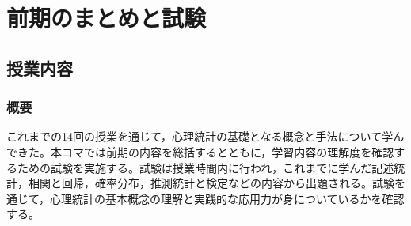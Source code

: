 \section{前期のまとめと試験}
\label{b15_summary_exam}

\subsection{授業内容}
\subsubsection{概要}
これまでの14回の授業を通じて，心理統計の基礎となる概念と手法について学んできた。本コマでは前期の内容を総括するとともに，学習内容の理解度を確認するための試験を実施する。試験は授業時間内に行われ，これまでに学んだ記述統計，相関と回帰，確率分布，推測統計と検定などの内容から出題される。試験を通じて，心理統計の基本概念の理解と実践的な応用力が身についているかを確認する。

